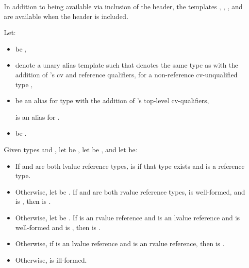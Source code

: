 \pnum
In addition to being available via inclusion
of the  header, the templates
,
,
, and
are available
when the header  is included.

%
\pnum
Let:
\begin{itemize}
\item {} be
  ,
\item {} denote a unary alias template 
  such that  denotes the same type as  with the addition
  of 's cv and reference qualifiers, for a non-reference cv-unqualified
  type ,
\item {} be an alias for type 
  with the addition of 's top-level cv-qualifiers,
  \begin{example}
     is an alias for
    .
  \end{example}
\item {} be
  .
\end{itemize}
Given types  and ,
let  be ,
let  be , and
let  be:
\begin{itemize}
\item If  and  are both lvalue reference types,
   is
   if that type exists
  and is a reference type.
\item Otherwise, let  be
  .
  If  and  are both rvalue reference types,
   is well-formed, and
   is ,
  then  is .
\item Otherwise, let  be
  . If  is an rvalue
  reference and  is an lvalue reference and  is
  well-formed and  is
  , then  is .
\item Otherwise, if  is an lvalue reference and 
  is an rvalue reference, then  is
  .
\item Otherwise,  is ill-formed.
\end{itemize}

